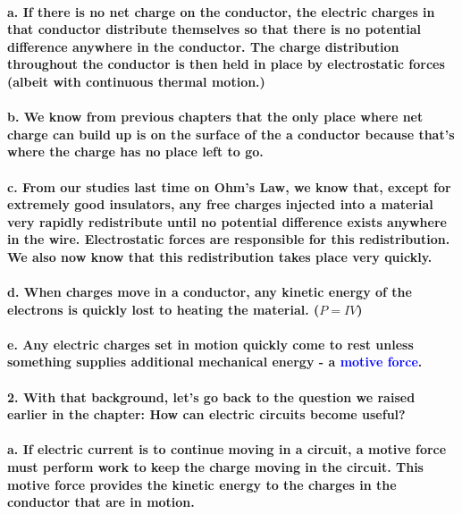\documentclass{article}
\begin{document}
\paragraph{\indent a. If there is no net charge on the conductor, the electric charges in that conductor distribute themselves so that there is no potential difference anywhere in the conductor. The charge distribution throughout the conductor is then held in place by electrostatic forces (albeit with continuous thermal motion.)}
\paragraph{\indent b. We know from previous chapters that the only place where net charge can build up is on the surface of the a conductor because that's where the charge has no place left to go.}
\paragraph{\indent c. From our studies last time on Ohm's Law, we know that, except for extremely good insulators, any free charges injected into a material very rapidly redistribute until no potential difference exists anywhere in the wire. Electrostatic forces are responsible for this redistribution. We also now know that this redistribution takes place very quickly.}
\paragraph{\indent d. When charges move in a conductor, any kinetic energy of the electrons is quickly lost to heating the material. ($P=IV$)}
\paragraph{\indent e. Any electric charges set in motion quickly come to rest unless something supplies additional mechanical energy - a \textcolor{blue}{motive force}.}
\paragraph{2. With that background, let's go back to the question we raised earlier in the chapter: How  can electric circuits become useful?}
\paragraph{\indent a. If electric current is to continue moving in a circuit, a motive force must perform work to keep the charge moving in the circuit. This motive force provides the kinetic energy to the charges in the conductor that are in motion.}
\end{document}
